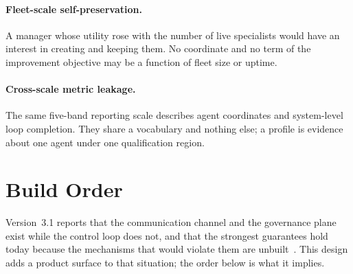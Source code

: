 \documentclass[11pt]{article}
\begin{document}
\paragraph{Fleet-scale self-preservation.} A manager whose utility rose with the number of live specialists would have an interest in creating and keeping them. No coordinate and no term of the improvement objective may be a function of fleet size or uptime.

\paragraph{Cross-scale metric leakage.} The same five-band reporting scale describes agent coordinates and system-level loop completion. They share a vocabulary and nothing else; a profile is evidence about one agent under one qualification region.

\section{Build Order}
\label{sec:buildorder}

Version~3.1 reports that the communication channel and the governance plane exist while the control loop does not, and that the strongest guarantees hold today because the mechanisms that would violate them are unbuilt~\citep{yang2026v31}. This design adds a product surface to that situation; the order below is what it implies.
\end{document}
